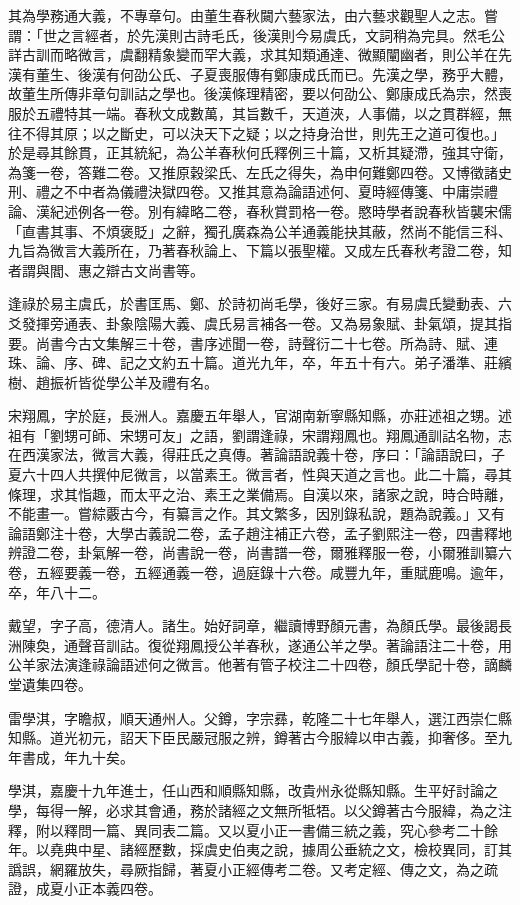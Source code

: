 \begin{pinyinscope}
其為學務通大義，不專章句。由董生春秋闚六藝家法，由六藝求觀聖人之志。嘗謂：「世之言經者，於先漢則古詩毛氏，後漢則今易虞氏，文詞稍為完具。然毛公詳古訓而略微言，虞翻精象變而罕大義，求其知類通達、微顯闡幽者，則公羊在先漢有董生、後漢有何劭公氏、子夏喪服傳有鄭康成氏而已。先漢之學，務乎大體，故董生所傳非章句訓詁之學也。後漢條理精密，要以何劭公、鄭康成氏為宗，然喪服於五禮特其一端。春秋文成數萬，其旨數千，天道浹，人事備，以之貫群經，無往不得其原；以之斷史，可以決天下之疑；以之持身治世，則先王之道可復也。」於是尋其餘貫，正其統紀，為公羊春秋何氏釋例三十篇，又析其疑滯，強其守衛，為箋一卷，答難二卷。又推原穀梁氏、左氏之得失，為申何難鄭四卷。又博徵諸史刑、禮之不中者為儀禮決獄四卷。又推其意為論語述何、夏時經傳箋、中庸崇禮論、漢紀述例各一卷。別有緯略二卷，春秋賞罰格一卷。愍時學者說春秋皆襲宋儒「直書其事、不煩褒貶」之辭，獨孔廣森為公羊通義能抉其蔽，然尚不能信三科、九旨為微言大義所在，乃著春秋論上、下篇以張聖權。又成左氏春秋考證二卷，知者謂與閻、惠之辯古文尚書等。

逢祿於易主虞氏，於書匡馬、鄭、於詩初尚毛學，後好三家。有易虞氏變動表、六爻發揮旁通表、卦象陰陽大義、虞氏易言補各一卷。又為易象賦、卦氣頌，提其指要。尚書今古文集解三十卷，書序述聞一卷，詩聲衍二十七卷。所為詩、賦、連珠、論、序、碑、記之文約五十篇。道光九年，卒，年五十有六。弟子潘準、莊繽樹、趙振祈皆從學公羊及禮有名。

宋翔鳳，字於庭，長洲人。嘉慶五年舉人，官湖南新寧縣知縣，亦莊述祖之甥。述祖有「劉甥可師、宋甥可友」之語，劉謂逢祿，宋謂翔鳳也。翔鳳通訓詁名物，志在西漢家法，微言大義，得莊氏之真傳。著論語說義十卷，序曰：「論語說曰，子夏六十四人共撰仲尼微言，以當素王。微言者，性與天道之言也。此二十篇，尋其條理，求其恉趣，而太平之治、素王之業備焉。自漢以來，諸家之說，時合時離，不能畫一。嘗綜覈古今，有纂言之作。其文繁多，因別錄私說，題為說義。」又有論語鄭注十卷，大學古義說二卷，孟子趙注補正六卷，孟子劉熙注一卷，四書釋地辨證二卷，卦氣解一卷，尚書說一卷，尚書譜一卷，爾雅釋服一卷，小爾雅訓纂六卷，五經要義一卷，五經通義一卷，過庭錄十六卷。咸豐九年，重賦鹿鳴。逾年，卒，年八十二。

戴望，字子高，德清人。諸生。始好詞章，繼讀博野顏元書，為顏氏學。最後謁長洲陳奐，通聲音訓詁。復從翔鳳授公羊春秋，遂通公羊之學。著論語注二十卷，用公羊家法演逢祿論語述何之微言。他著有管子校注二十四卷，顏氏學記十卷，謫麟堂遺集四卷。

雷學淇，字瞻叔，順天通州人。父鐏，字宗彞，乾隆二十七年舉人，選江西崇仁縣知縣。道光初元，詔天下臣民嚴冠服之辨，鐏著古今服緯以申古義，抑奢侈。至九年書成，年九十矣。

學淇，嘉慶十九年進士，任山西和順縣知縣，改貴州永從縣知縣。生平好討論之學，每得一解，必求其會通，務於諸經之文無所牴牾。以父鐏著古今服緯，為之注釋，附以釋問一篇、異同表二篇。又以夏小正一書備三統之義，究心參考二十餘年。以堯典中星、諸經歷數，採虞史伯夷之說，據周公垂統之文，檢校異同，訂其譌誤，網羅放失，尋厥指歸，著夏小正經傳考二卷。又考定經、傳之文，為之疏證，成夏小正本義四卷。


\end{pinyinscope}
